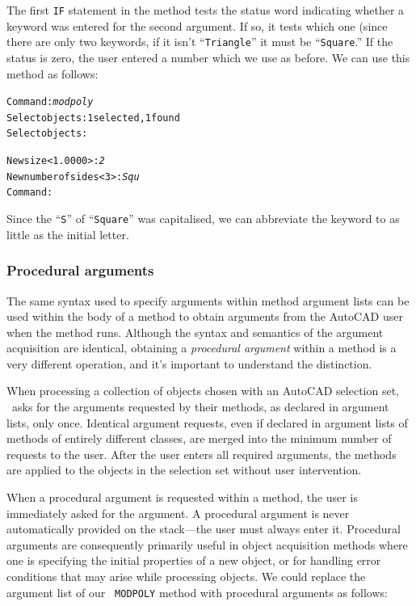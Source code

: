 \documentclass{article}
\begin{document}
The first {\tt IF} statement in the method tests the status word
indicating whether a keyword was entered for the second argument.  If
so, it tests which one (since there are only two keywords, if it isn't
``{\tt Triangle}'' it must be ``{\tt Square}.'' If the status is
zero, the user entered a number which we use as before.  We can use
this method as follows:

\begin{alltt}
Command: {\em modpoly}
Select objects: 1 selected, 1 found
Select objects:

New size <1.0000>: {\em 2}
New number of sides <3>: {\em Squ}
Command:
\end{alltt}

Since the ``{\tt S}'' of ``{\tt Square}'' was capitalised, we can
abbreviate the keyword to as little as the initial letter.

\subsubsection{Procedural arguments}

The same syntax used to specify arguments within method argument lists
can be used within the body of a method to obtain arguments from the
AutoCAD user when the method runs.  Although the syntax and semantics
of the argument acquisition are identical, obtaining a {\em
procedural argument} within a method is a very different operation,
and it's important to understand the distinction.

When processing a collection of objects chosen with an AutoCAD
selection set, \cw\ asks for the arguments requested by their methods, as
declared in argument lists, only once.  Identical
argument requests, even if declared in argument lists of methods of
entirely different classes, are merged into the minimum number of
requests to the user.  After the user enters all required arguments,
the methods are applied to the objects in the selection set without
user intervention.

When a procedural argument is requested within a method, the user is
immediately asked for the argument.  A procedural argument is never
automatically provided on the stack---the user must always enter it.
Procedural arguments are consequently primarily useful in object
acquisition methods where one is specifying the initial properties of
a new object, or for handling error conditions that may arise while
processing objects.  We could replace the argument list of our {\tt
MODPOLY} method with procedural arguments as follows:
\end{document}
